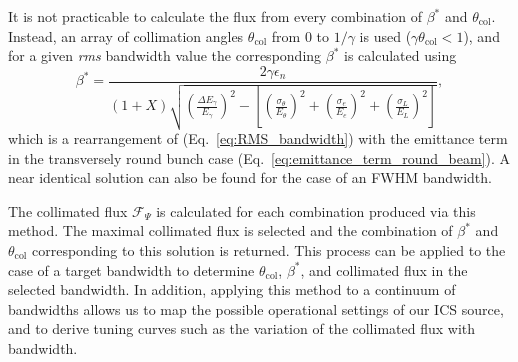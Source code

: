 \documentclass[../main.tex]{subfiles}
\begin{document}
It is not practicable to calculate the flux from every combination of $\beta^{*}$ and $\theta_{\mathrm{col}}$. Instead, an array of collimation angles $\theta_{\mathrm{col}}$ from 0 to $1/\gamma$ is used ($\gamma\theta_{\mathrm{col}}<1$), and for a given \textit{rms} bandwidth value the corresponding $\beta^*$ is calculated using
\begin{equation}
\beta^{*} = \frac{2\gamma\epsilon_{n}}{\left(1+X\right)\sqrt{\left(\frac{\Delta E_{\gamma}}{E_{\gamma}}\right)^{2}-\left[\left(\frac{\sigma_{\theta}}{E_{\theta}}\right)^{2}+\left(\frac{\sigma_{e}}{E_{e}}\right)^{2}+\left(\frac{\sigma_{L}}{E_{L}}\right)^{2}\right]}},
\label{eq:beta_star_round_beam}
\end{equation}
which is a rearrangement of (Eq.~\ref{eq:RMS_bandwidth}) with the emittance term in the transversely round bunch case (Eq.~\ref{eq:emittance_term_round_beam}). A near identical solution can also be found for the case of an FWHM bandwidth. 

The collimated flux $\mathcal{F}_{\Psi}$ is calculated for each combination produced via this method. The maximal collimated flux is selected and the combination of $\beta^{*}$ and $\theta_{\mathrm{col}}$ corresponding to this solution is returned. This process can be applied to the case of a target bandwidth to determine $\theta_{\mathrm{col}}$, $\beta^{*}$, and collimated flux in the selected bandwidth. In addition, applying this method to a continuum of bandwidths allows us to map the possible operational settings of our ICS source, and to derive tuning curves such as the variation of the collimated flux with bandwidth.
\end{document}
